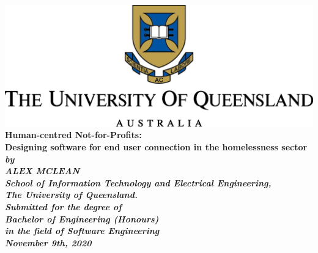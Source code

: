 \begin{titlepage}
    \renewcommand{\baselinestretch}{1.0}
    \begin{center}
        \includegraphics{assets/uq.png}\\
        \vspace*{35mm}
        \Huge\bf
        Human-centred Not-for-Profits:\\
        Designing software for end user connection in the homelessness sector\\
        \vspace{20mm}
        \large\sl
        by\\
        ALEX MCLEAN
        \medskip\\
        \rm
        School of Information Technology and Electrical Engineering,\\
        The University of Queensland.\\
        \vspace{30mm}
        Submitted for the degree of\\
        Bachelor of Engineering (Honours)
        \smallskip\\
        \normalsize
        in the field of Software Engineering
        \medskip\\
        \large
        November 9th, 2020
    \end{center}
\end{titlepage}

\cleardoublepage
